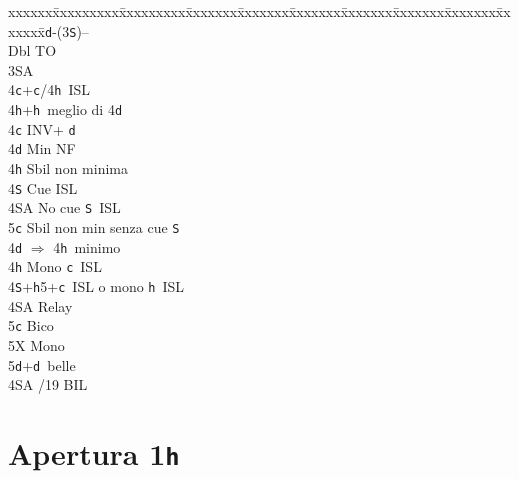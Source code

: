 \documentclass[a4paper,italian]{article}
\newcommand{\BS}{\small{\texttt{S}}}
\newcommand{\BC}{\small{\texttt{c}}}
\newcommand{\BD}{\small{\texttt{d}}}
\newcommand{\BH}{\small{\texttt{h}}}
\newcommand{\pdfh}{\texorpdfstring{\texttt{h}}{H}}
\newenvironment{bidtable}
{\begin{tabbing}

    xxxxxx\=xxxxxxxxx\=xxxxxxxxx\=xxxxxxx\=xxxxxxx\=xxxxxxx\=xxxxxxx\=xxxxxxx\=xxxxxxx\=xxxxxxx\=\kill}
{\end{tabbing} }%
\begin{document}
\begin{multicols}{2}
    \begin{bidtable}
        1\BD-(3\BS)--\+\\
        Dbl \> TO\+\\
        3\small{SA}\+\\
        4\BC {}+\BC /4\BH\ ISL\\
        4\BH {}+\BH\ meglio di 4\BD \-\-\\
        4\BC \> INV+ \BD\+\\
        4\BD \> Min NF\\
        4\BH \> Sbil non minima\\
        4\BS \> Cue ISL\\
        4\small{SA} \> No cue \BS\ ISL\\
        5\BC \> Sbil non min senza cue \BS \-\\
        4\BD \> $\Rightarrow$ 4\BH\ minimo\\
        4\BH \> Mono \BC\ ISL\\
        4\BS {}+\BH5+\BC\ ISL o mono \BH\ ISL\+\\
        4\small{SA} \> Relay\+\\
        5\BC \> Bico\\
        5X \> Mono\-\\
        5\BD {}+\BD\ belle\-\\
        4\small{SA} /19 BIL\-
    \end{bidtable}

\end{multicols}

\pagebreak

\section{Apertura 1\pdfh}
\end{document}
